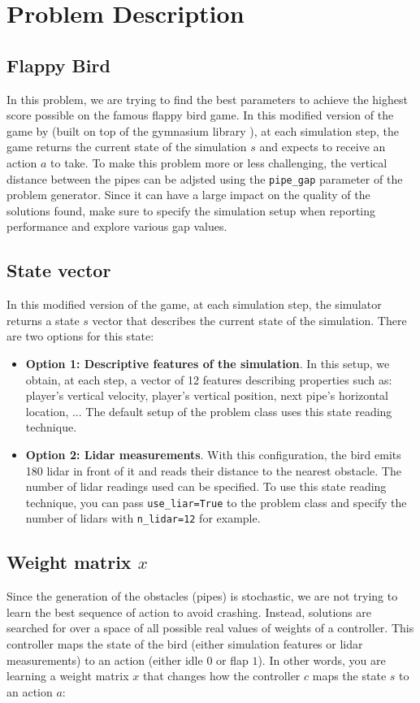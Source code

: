 \documentclass[runningheads]{llncs}
\begin{document}
\section{Problem Description}\label{sect:descr}

\subsection{Flappy Bird}\label{sect:LL}
In this problem, we are trying to find the best parameters to achieve the highest score possible on the famous flappy bird game. In this modified version of the game by \cite{s24061905} (built on top of the gymnasium library \cite{towers2024gymnasiumstandardinterfacereinforcement}), at each simulation step, the game returns the current state of the simulation $s$ and expects to receive an action $a$ to take. To make this problem more or less challenging, the vertical distance between the pipes can be adjsted using the \texttt{pipe\_gap} parameter of the problem generator. Since it can have a large impact on the quality of the solutions found, make sure to specify the simulation setup when reporting performance and explore various gap values.

\subsection{State vector}
In this modified version of the game, at each simulation step, the simulator returns a state $s$ vector that describes the current state of the simulation. There are two options for this state:
\begin{itemize}
    \item \textbf{Option 1: Descriptive features of the simulation}. In this setup, we obtain, at each step, a vector of 12 features describing properties such as: player's vertical velocity, player's vertical position, next pipe's horizontal location, ... The default setup of the problem class uses this state reading technique.
    \item \textbf{Option 2: Lidar measurements}. With this configuration, the bird emits 180 lidar in front of it and reads their distance to the nearest obstacle. The number of lidar readings used can be specified. To use this state reading technique, you can pass \texttt{use\_liar=True} to the problem class and specify the number of lidars with \texttt{n\_lidar=12} for example.
\end{itemize}

\subsection{Weight matrix $x$}
Since the generation of the obstacles (pipes) is stochastic, we are not trying to learn the best sequence of action to avoid crashing. Instead, solutions are searched for over a space of all possible real values of weights of a controller. This controller maps the state of the bird (either simulation features or lidar measurements) to an action (either idle $0$ or flap $1$). In other words, you are learning a weight matrix $x$ that changes how the controller $c$ maps the state $s$ to an action $a$:
\end{document}
